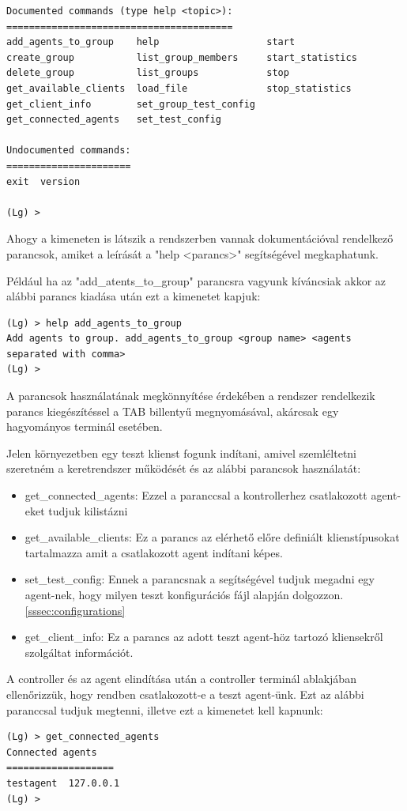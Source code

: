 \documentclass[a4paper,12pt,oneside]{report}
\begin{document}
\begin{enumerate}
\begin{lstlisting}
Documented commands (type help <topic>):
========================================
add_agents_to_group    help                   start           
create_group           list_group_members     start_statistics
delete_group           list_groups            stop            
get_available_clients  load_file              stop_statistics
get_client_info        set_group_test_config
get_connected_agents   set_test_config      

Undocumented commands:
======================
exit  version

(Lg) >

\end{lstlisting}

Ahogy a kimeneten is látszik a rendszerben vannak dokumentációval rendelkező parancsok, amiket a leírását a "help <parancs>" segítségével megkaphatunk.

Például ha az "add\_atents\_to\_group" parancsra vagyunk kíváncsiak akkor az alábbi parancs kiadása után ezt a kimenetet kapjuk:

\begin{lstlisting}
(Lg) > help add_agents_to_group
Add agents to group. add_agents_to_group <group name> <agents separated with comma>
(Lg) >
\end{lstlisting}

A parancsok használatának megkönnyítése érdekében a rendszer rendelkezik parancs kiegészítéssel a TAB billentyű megnyomásával, akárcsak egy hagyományos terminál esetében.

Jelen környezetben egy teszt klienst fogunk indítani, amivel szemléltetni szeretném a keretrendszer működését és az alábbi parancsok használatát:
\begin{itemize}
\itemsep0em
\item get\_connected\_agents: Ezzel a paranccsal a kontrollerhez csatlakozott agent-eket tudjuk kilistázni
\item get\_available\_clients: Ez a parancs az elérhető előre definiált klienstípusokat tartalmazza amit a csatlakozott agent indítani képes.
\item set\_test\_config: Ennek a parancsnak a segítségével tudjuk megadni egy agent-nek, hogy milyen teszt konfigurációs fájl alapján dolgozzon. \ref{sssec:configurations}
\item get\_client\_info: Ez a parancs az adott teszt agent-höz tartozó kliensekről szolgáltat információt.
\end{itemize}

A controller és az agent elindítása után a controller terminál ablakjában ellenőrizzük, hogy rendben csatlakozott-e a teszt agent-ünk.
Ezt az alábbi paranccsal tudjuk megtenni, illetve ezt a kimenetet kell kapnunk:
\begin{lstlisting}
(Lg) > get_connected_agents
Connected agents
===================
testagent  127.0.0.1
(Lg) >


\end{lstlisting}
\end{enumerate}
\end{document}
